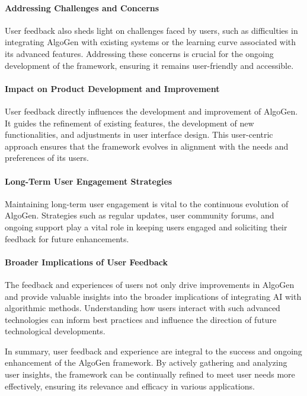 \documentclass{article}
\begin{document}
\paragraph{Addressing Challenges and Concerns}
User feedback also sheds light on challenges faced by users, such as difficulties in integrating AlgoGen with existing systems or the learning curve associated with its advanced features. Addressing these concerns is crucial for the ongoing development of the framework, ensuring it remains user-friendly and accessible.

\paragraph{Impact on Product Development and Improvement}
User feedback directly influences the development and improvement of AlgoGen. It guides the refinement of existing features, the development of new functionalities, and adjustments in user interface design. This user-centric approach ensures that the framework evolves in alignment with the needs and preferences of its users.

\paragraph{Long-Term User Engagement Strategies}
Maintaining long-term user engagement is vital to the continuous evolution of AlgoGen. Strategies such as regular updates, user community forums, and ongoing support play a vital role in keeping users engaged and soliciting their feedback for future enhancements.

\paragraph{Broader Implications of User Feedback}
The feedback and experiences of users not only drive improvements in AlgoGen and provide valuable insights into the broader implications of integrating AI with algorithmic methods. Understanding how users interact with such advanced technologies can inform best practices and influence the direction of future technological developments.

In summary, user feedback and experience are integral to the success and ongoing enhancement of the AlgoGen framework. By actively gathering and analyzing user insights, the framework can be continually refined to meet user needs more effectively, ensuring its relevance and efficacy in various applications.
\end{document}
